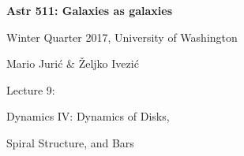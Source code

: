 \documentclass[letterpaper,landscape]{slides}
\begin{document}
\newcommand{\Spicslide}[7]{%
  \begin{slide}
     \begin{center}
        \begin{minipage}{#5in}
            \vskip #6in
            \hskip #7in
            {\scalebox{#4}{\texttt{[image: \#1.\#2]}}}
        \end{minipage}
     \end{center}
     \vfill
  \end{slide}
}
 




\begin{slide}

\phantom{x}
\vskip -2in
\begin{center}
\bfseries
{\large {\color{blue} Astr 511: Galaxies as galaxies}}
\end{center}

{\centerline {{\color{blue} 
Winter Quarter 2017, University of Washington}}}
{\centerline {{\color{blue} 
Mario Juri\'{c} \& \v{Z}eljko Ivezi\'{c} }}}

\vskip 1.6in

{\centerline {\huge {\color{red}      Lecture 9:             }}}
\vskip 0.2in 
{\centerline {\Large {\color{blue} Dynamics IV: Dynamics of Disks, }}}
\vskip 0.1in
{\centerline {\Large {\color{blue} Spiral Structure, and Bars }}}

\vfill
\end{slide}
\end{document}
